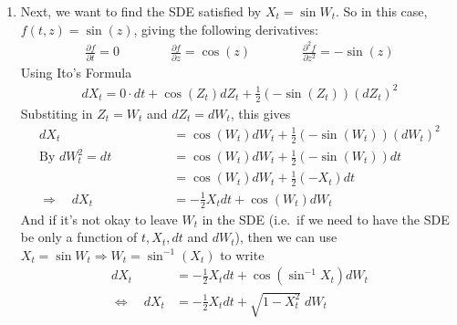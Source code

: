 \documentclass[12pt]{article}
\theoremstyle{plain}
\theoremstyle{definition}
\theoremstyle{remark}
\begin{document}
\begin{enumerate}
\begin{enumerate}
      \item %
        Next, we want to find the SDE satisfied by $X_t = \sin W_t$. So
        in this case, $f(t,z) = \sin(z)$, giving the following
        derivatives:
        \begin{align*}
          \frac{\partial f}{\partial t} = 0 \qquad\qquad
          \frac{\partial f}{\partial z} = \cos(z) \qquad\qquad
          \frac{\partial^2 f}{\partial z^2} = -\sin(z)
        \end{align*}
        Using Ito's Formula
        \begin{align*}
          dX_t = 0 \cdot dt + \cos(Z_t) dZ_t
          + \frac{1}{2} \left(-\sin(Z_t)\right) (dZ_t)^2
        \end{align*}
        Substiting in $Z_t = W_t$ and $dZ_t=dW_t$, this gives
        \begin{align*}
          dX_t &= \cos(W_t) dW_t
          + \frac{1}{2} \left(-\sin(W_t)\right) (dW_t)^2\\
          \text{By $dW_t^2=dt$} \qquad\qquad
          &= \cos(W_t) dW_t
          + \frac{1}{2} \left(-\sin(W_t)\right) dt \\
          &= \cos(W_t) dW_t
          + \frac{1}{2} \left(-X_t\right) dt \\
          \Rightarrow\quad
          dX_t &= -\frac{1}{2} X_t dt +  \cos(W_t) dW_t
        \end{align*}
        And if it's not okay to leave $W_t$ in the SDE (i.e.\ if we need
        to have the SDE be only a function of $t,X_t,dt$ and $dW_t$),
        then we can use $X_t=\sin W_t \Rightarrow W_t = \sin^{-1}(X_t)$
        to write
        \begin{align*}
          dX_t &= -\frac{1}{2} X_t dt +  \cos(\sin^{-1}X_t) dW_t\\
          \Leftrightarrow \quad dX_t
          &= -\frac{1}{2} X_t dt +  \sqrt{1-X_t^2} \; dW_t
        \end{align*}



\end{enumerate}
\end{enumerate}
\end{document}
